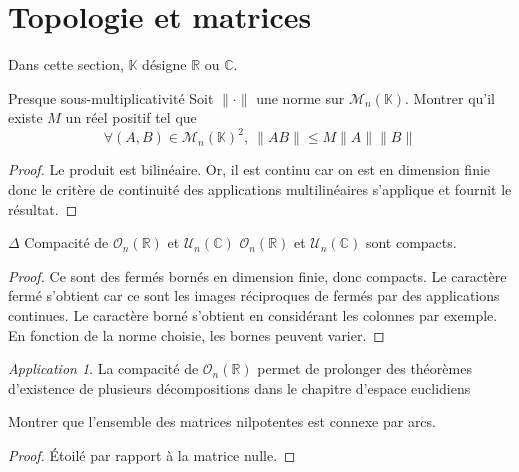 \documentclass[french,a4paper]{article}
\newcommand{\R}{\mathbb{R}}
\newcommand{\C}{\mathbb{C}}
\newcommand{\K}{\mathbb{K}}
\theoremstyle{plain}
\theoremstyle{definition}
\theoremstyle{remark}
\newtheorem*{app}{Application}
\begin{document}
\section{Topologie et matrices}

Dans cette section, $\K$ désigne $\R$ ou $\C$.

\begin{ex}{Presque sous-multiplicativité}
	Soit $\lVert\cdot\rVert$ une norme sur $\mathcal{M}_n(\K)$. Montrer qu'il existe $M$ un réel positif tel que $$\forall(A,B)\in\mathcal{M}_n(\K)^2,\ \lVert AB\rVert\leqslant M\lVert A\rVert\lVert B\rVert$$
\end{ex}
\begin{proof}
	Le produit est bilinéaire. Or, il est continu car on est en dimension finie donc le critère de continuité des applications multilinéaires s'applique et fournit le résultat.
\end{proof}

\begin{ex}{$\Delta$ Compacité de $\mathcal{O}_n(\R)$ et $\mathcal{U}_n(\C)$} $\mathcal{O}_n(\R)$ et $\mathcal{U}_n(\C)$ sont compacts.
\end{ex} \begin{proof}
	Ce sont des fermés bornés en dimension finie, donc compacts. Le caractère fermé s'obtient car ce sont les images réciproques de fermés par des applications continues. Le caractère borné s'obtient en considérant les colonnes par exemple. En fonction de la norme choisie, les bornes peuvent varier.
\end{proof}
\begin{app} La compacité de $\mathcal{O}_n(\R)$ permet de prolonger des théorèmes d'existence de plusieurs décompositions dans le chapitre d'espace euclidiens \end{app}

\begin{ex}{}
	Montrer que l'ensemble des matrices nilpotentes est connexe par arcs.
\end{ex}
\begin{proof}
	Étoilé par rapport à la matrice nulle.
\end{proof}
\end{document}
